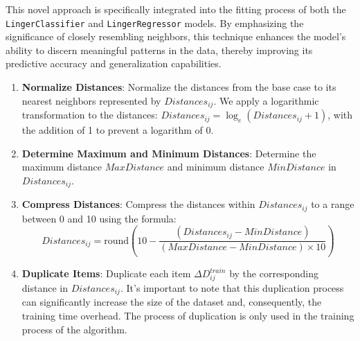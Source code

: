 \documentclass[a4paper, 12pt]{report}
\begin{document}
This novel approach is specifically integrated into the fitting process of both the \texttt{LingerClassifier} and \texttt{LingerRegressor} models. 
By emphasizing the significance of closely resembling neighbors, this technique enhances the model's ability to discern meaningful patterns in the data, 
thereby improving its predictive accuracy and generalization capabilities.

\begin{enumerate}
    \item \textbf{Normalize Distances}: Normalize the distances from the base case to its nearest neighbors represented by $Distances_{ij}$. 
    We apply a logarithmic transformation to the distances: $Distances_{ij} = \log_e(Distances_{ij} + 1)$, with the addition of 1 to prevent a logarithm of 0.
    
    \item \textbf{Determine Maximum and Minimum Distances}: Determine the maximum distance $MaxDistance$ and minimum distance $MinDistance$ in $Distances_{ij}$.
    
    \item \textbf{Compress Distances}: Compress the distances within $Distances_{ij}$ to a range between 0 and 10 using the formula:
    \[
        Distances_{ij} = \text{round}\left(10 - \frac{(Distances_{ij} - MinDistance)}{(MaxDistance - MinDistance) \times 10}\right)
    \]
    
    \item \textbf{Duplicate Items}: Duplicate each item $\Delta D^{train}_{ij}$ by the corresponding distance in $Distances_{ij}$. 
    It's important to note that this duplication process can significantly increase the size of the dataset and, consequently, the training time overhead.
    The process of duplication is only used in the training process of the algorithm.
\end{enumerate}
\end{document}
